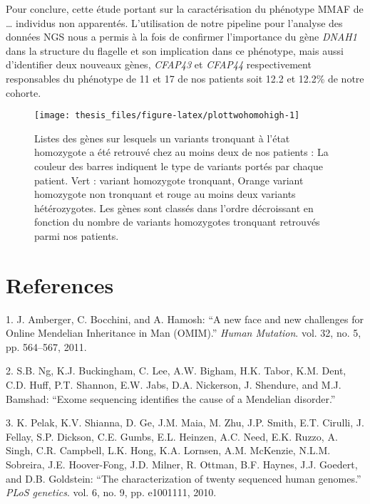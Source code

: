 \documentclass[12pt,twoside]{reedthesis}
\theoremstyle{definition}
\theoremstyle{definition}
\theoremstyle{remark}
\begin{document}
  Pour conclure, cette étude portant sur la caractérisation du phénotype
  MMAF de \ldots{} individus non apparentés. L'utilisation de notre
  pipeline pour l'analyse des données NGS nous a permis à la fois de
  confirmer l'importance du gène \emph{DNAH1} dans la structure du
  flagelle et son implication dans ce phénotype, mais aussi d'identifier
  deux nouveaux gènes, \emph{CFAP43} et \emph{CFAP44} respectivement
  responsables du phénotype de 11 et 17 de nos patients soit 12.2 et
  12.2\% de notre cohorte.
  
  \newpage
  
  \begin{figure}
  
  {\centering \texttt{[image: thesis\_files/figure-latex/plottwohomohigh-1]} 
  
  }
  
  \caption[Listes des gènes sur lesquels un variants tronquant à l'état homozygote a été retrouvé chez au moins deux de nos patients]{Listes des gènes sur lesquels un variants tronquant à l'état homozygote a été retrouvé chez au moins deux de nos patients : La couleur des barres indiquent le type de variants portés par chaque patient. Vert : variant homozygote tronquant, Orange variant homozygote non tronquant et rouge au moins deux variants hétérozygotes. Les gènes sont classés dans l'ordre décroissant en fonction du nombre de variants homozygotes tronquant retrouvés parmi nos patients.}\label{fig:plottwohomohigh}
  \end{figure}
  
  \chapter*{References}\label{references}
  
  \hypertarget{refs}{}
  \hypertarget{ref-Amberger2011}{}
  1. J. Amberger, C. Bocchini, and A. Hamosh: ``A new face and new
  challenges for Online Mendelian Inheritance in Man (OMIM).'' \emph{Human
  Mutation}. vol. 32, no. 5, pp. 564--567, 2011.
  
  \hypertarget{ref-Ng}{}
  2. S.B. Ng, K.J. Buckingham, C. Lee, A.W. Bigham, H.K. Tabor, K.M. Dent,
  C.D. Huff, P.T. Shannon, E.W. Jabs, D.A. Nickerson, J. Shendure, and
  M.J. Bamshad: ``Exome sequencing identifies the cause of a Mendelian
  disorder.''
  
  \hypertarget{ref-Pelak2010}{}
  3. K. Pelak, K.V. Shianna, D. Ge, J.M. Maia, M. Zhu, J.P. Smith, E.T.
  Cirulli, J. Fellay, S.P. Dickson, C.E. Gumbs, E.L. Heinzen, A.C. Need,
  E.K. Ruzzo, A. Singh, C.R. Campbell, L.K. Hong, K.A. Lornsen, A.M.
  McKenzie, N.L.M. Sobreira, J.E. Hoover-Fong, J.D. Milner, R. Ottman,
  B.F. Haynes, J.J. Goedert, and D.B. Goldstein: ``The characterization of
  twenty sequenced human genomes.'' \emph{PLoS genetics}. vol. 6, no. 9,
  pp. e1001111, 2010.
  
\end{document}
